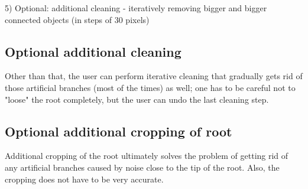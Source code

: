 5) Optional: additional cleaning
- iteratively removing bigger and bigger connected objects (in steps of 30 pixels)



\subsection{Optional additional cleaning}

Other than that, the user can perform iterative cleaning that gradually gets rid of those artificial branches (most of the times) as well; one has to be careful not to "loose" the root completely, but the user can undo the last cleaning step. 

\subsection{Optional additional cropping of root}

Additional cropping of the root ultimately solves the problem of getting rid of any artificial branches caused by noise close to the tip of the root.
Also, the cropping does not have to be very accurate.



%
%
%
%
%
%


